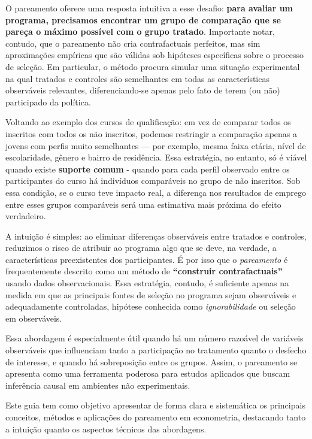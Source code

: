 O pareamento oferece uma resposta intuitiva a esse desafio: \textbf{para avaliar um programa, precisamos encontrar um grupo de comparação que se pareça o máximo possível com o grupo tratado}. Importante notar, contudo, que o pareamento não cria contrafactuais perfeitos, mas sim aproximações empíricas que são válidas sob hipóteses específicas sobre o processo de seleção. Em particular, o método procura simular uma situação experimental na qual tratados e controles são semelhantes em todas as características observáveis relevantes, diferenciando-se apenas pelo fato de terem (ou não) participado da política.


Voltando ao exemplo dos cursos de qualificação: em vez de comparar todos os inscritos com todos os não inscritos, podemos restringir a comparação apenas a jovens com perfis muito semelhantes — por exemplo, mesma faixa etária, nível de escolaridade, gênero e bairro de residência. Essa estratégia, no entanto, só é viável quando existe \textbf{suporte comum} - quando para cada perfil observado entre os participantes do curso há indivíduos comparáveis no grupo de não inscritos. Sob essa condição, se o curso teve impacto real, a diferença nos resultados de emprego entre esses grupos comparáveis será uma estimativa mais próxima do efeito verdadeiro.


A intuição é simples: ao eliminar diferenças observáveis entre tratados e controles, reduzimos o risco de atribuir ao programa algo que se deve, na verdade, a características preexistentes dos participantes. É por isso que o \textit{pareamento} é frequentemente descrito como um método de \textbf{``construir contrafactuais''} usando dados observacionais. Essa estratégia, contudo, é suficiente apenas na medida em que as principais fontes de seleção no programa sejam observáveis e adequadamente controladas, hipótese conhecida como \textit{ignorabilidade} ou seleção em observáveis.


Essa abordagem é especialmente útil quando há um número razoável de variáveis observáveis que influenciam tanto a participação no tratamento quanto o desfecho de interesse, e quando há sobreposição entre os grupos. Assim, o pareamento se apresenta como uma ferramenta poderosa para estudos aplicados que buscam inferência causal em ambientes não experimentais.

Este guia tem como objetivo apresentar de forma clara e sistemática os principais conceitos, métodos e aplicações do pareamento em econometria, destacando tanto a intuição quanto os aspectos técnicos das abordagens.

